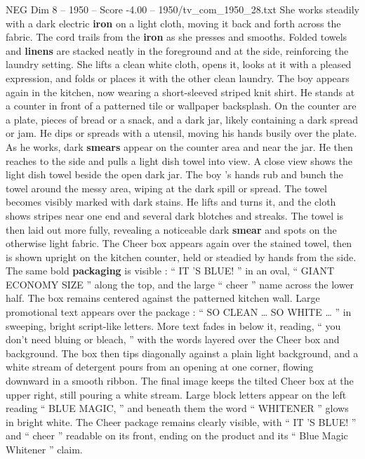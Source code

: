 \begin{textsample}{NEG Dim 8 – 1950 – Score -4.00 – 1950/tv\_com\_1950\_28.txt}
She works steadily with a dark electric \textbf{iron} on a light cloth, moving it back and forth across the fabric.
The cord trails from the \textbf{iron} as she presses and smooths.
Folded towels and \textbf{linens} are stacked neatly in the foreground and at the side, reinforcing the laundry setting.
She lifts a clean white cloth, opens it, looks at it with a pleased expression, and folds or places it with the other clean laundry.
The boy appears again in the kitchen, now wearing a short-sleeved striped knit shirt.
He stands at a counter in front of a patterned tile or wallpaper backsplash.
On the counter are a plate, pieces of bread or a snack, and a dark jar, likely containing a dark spread or jam.
He dips or spreads with a utensil, moving his hands busily over the plate.
As he works, dark \textbf{smears} appear on the counter area and near the jar.
He then reaches to the side and pulls a light dish towel into view.
A close view shows the light dish towel beside the open dark jar.
The boy ’s hands rub and bunch the towel around the messy area, wiping at the dark spill or spread.
The towel becomes visibly marked with dark stains.
He lifts and turns it, and the cloth shows stripes near one end and several dark blotches and streaks.
The towel is then laid out more fully, revealing a noticeable dark \textbf{smear} and spots on the otherwise light fabric.
The Cheer box appears again over the stained towel, then is shown upright on the kitchen counter, held or steadied by hands from the side.
The same bold \textbf{packaging} is visible : “ IT ’S BLUE! ” in an oval, “ GIANT ECONOMY SIZE ” along the top, and the large “ cheer ” name across the lower half.
The box remains centered against the patterned kitchen wall.
Large promotional text appears over the package : “ SO CLEAN … SO WHITE … ” in sweeping, bright script-like letters.
More text fades in below it, reading, “ you don't need bluing or bleach, ” with the words layered over the Cheer box and background.
The box then tips diagonally against a plain light background, and a white stream of detergent pours from an opening at one corner, flowing downward in a smooth ribbon.
The final image keeps the tilted Cheer box at the upper right, still pouring a white stream.
Large block letters appear on the left reading “ BLUE MAGIC, ” and beneath them the word “ WHITENER ” glows in bright white.
The Cheer package remains clearly visible, with “ IT ’S BLUE! ” and “ cheer ” readable on its front, ending on the product and its “ Blue Magic Whitener ” claim.

\end{textsample}
